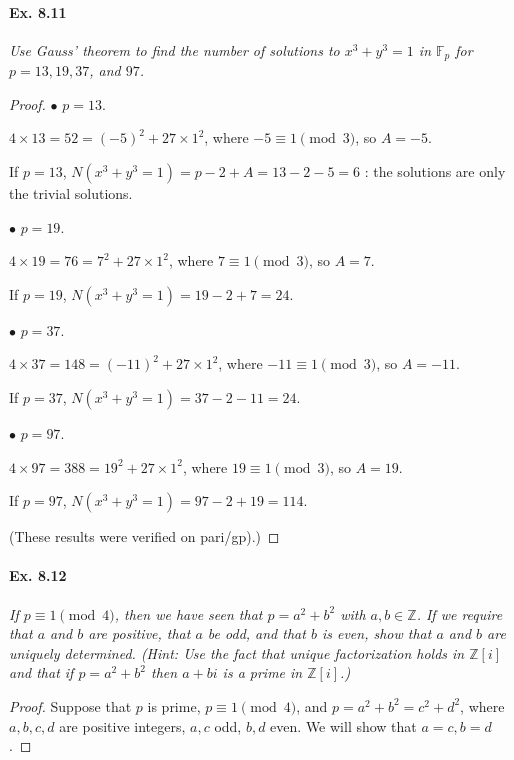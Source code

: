 \documentclass[11pt,a4paper]{article}
\newcommand{\Z}{\mathbb{Z}}
\newcommand{\F}{\mathbb{F}}
\begin{document}
{\paragraph{Ex. 8.11}

{\it Use Gauss' theorem to find the number of solutions to $x^3+y^3 = 1$ in $\F_p$ for $p=13,19,37$, and $97$.
}

\begin{proof}
$\bullet$ $p = 13$.

 $4 \times 13 = 52 =(-5)^2+27\times 1^2$, where $-5 \equiv 1 \pmod 3$, so $A = -5$.

If $p=13$, $N(x^3+y^3=1) = p-2+A = 13 - 2  - 5 = 6$ : the solutions are only the trivial solutions.

\medskip

$\bullet$ $p=19$.

$4 \times 19 = 76 = 7^2+27\times 1^2$, where $7\equiv1 \pmod 3$, so $A = 7$.

If $p = 19$, $N(x^3+y^3 = 1) = 19 -2 + 7 = 24$.

\medskip

$\bullet$ $p=37$.

$4\times 37 = 148 = (-11)^2 + 27 \times 1^2$, where $-11 \equiv 1 \pmod 3$, so $A = -11$.

If $p=37$, $N(x^3+y^3 = 1) = 37 - 2 -11 = 24$.

\medskip

$\bullet$ $p=97$.

$4 \times 97 = 388 = 19^2 + 27 \times 1^2$, where $19 \equiv 1 \pmod 3$, so $A = 19$.

If $p=97$, $N(x^3+y^3=1) = 97 - 2 + 19 = 114$.

(These results were verified on pari/gp).)
\end{proof}

\paragraph{Ex. 8.12}

{\it If $p\equiv 1 \pmod 4$, then we have seen that $p = a^2+b^2$ with $a,b \in \Z$. If we require that $a$ and $b$ are positive, that $a$ be odd, and that $b$ is even, show that $a$ and $b$ are uniquely determined. (Hint: Use the fact that unique factorization holds in $\Z[i]$ and that if $p = a^2+b^2$ then $a+bi$ is a prime in $\Z[i]$.)
}

\begin{proof}
Suppose that $p$ is prime, $p\equiv 1 \pmod 4$, and $p = a^2+b^2 = c^2+d^2$, where $a,b,c,d$ are positive integers, $a,c$ odd, $b,d$ even. We will show that $a=c, b=d$.


\end{proof}}
\end{document}
